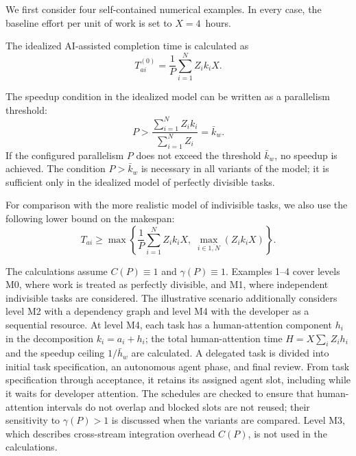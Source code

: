 
We first consider four self-contained numerical examples. In every case, the
baseline effort per unit of work is set to $X = 4$~hours.

The idealized AI-assisted completion time is calculated as
\[
  T_{ai}^{(0)} = \frac{1}{P} \sum_{i=1}^{N} Z_i k_i X.
\]

The speedup condition in the idealized model can be written as a parallelism
threshold:
\[
  P > \frac{\sum_{i=1}^{N} Z_i k_i}{\sum_{i=1}^{N} Z_i} = \bar{k}_w.
\]
If the configured parallelism $P$ does not exceed the threshold $\bar{k}_w$,
no speedup is achieved. The condition $P > \bar{k}_w$ is necessary in all
variants of the model; it is sufficient only in the idealized model of
perfectly divisible tasks.

For comparison with the more realistic model of indivisible tasks, we also use
the following lower bound on the makespan:
\[
  T_{ai} \ge \max\left\{ \frac{1}{P} \sum_{i=1}^{N} Z_i k_i X,\; \max_{i \in \overline{1,N}} (Z_i k_i X) \right\}.
\]

The calculations assume $C(P) \equiv 1$ and $\gamma(P) \equiv 1$. Examples
1--4 cover levels M0, where work is treated as perfectly divisible, and M1,
where independent indivisible tasks are considered. The illustrative scenario
additionally considers level M2 with a dependency graph and level M4 with the
developer as a sequential resource. At level M4, each task has a
human-attention component $h_i$ in the decomposition $k_i = a_i + h_i$; the
total human-attention time $H = X \sum_i Z_i h_i$ and the speedup ceiling
$1/\bar{h}_w$ are calculated. A delegated task is divided into initial task
specification, an autonomous agent phase, and final review. From task
specification through acceptance, it retains its assigned agent slot,
including while it waits for developer attention. The schedules are checked
to ensure that human-attention intervals do not overlap and blocked slots
are not reused; their sensitivity to $\gamma(P)>1$ is discussed when the
variants are compared.
Level M3, which describes cross-stream integration overhead $C(P)$, is not
used in the calculations.



